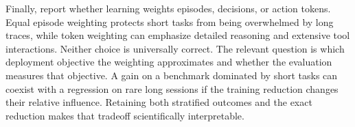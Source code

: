 Finally, report whether learning weights episodes, decisions, or action tokens. Equal episode weighting protects short tasks from being overwhelmed by long traces, while token weighting can emphasize detailed reasoning and extensive tool interactions. Neither choice is universally correct. The relevant question is which deployment objective the weighting approximates and whether the evaluation measures that objective. A gain on a benchmark dominated by short tasks can coexist with a regression on rare long sessions if the training reduction changes their relative influence. Retaining both stratified outcomes and the exact reduction makes that tradeoff scientifically interpretable.


